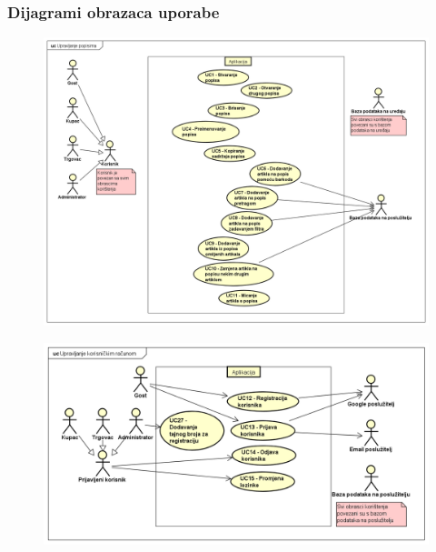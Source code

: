 			\subsubsection{Dijagrami obrazaca uporabe}
			    \begin{figure}[H]
			        \begin{center}
		            \includegraphics[width=.9\linewidth]{dijagrami/uc_upravljanje_popisima.png}
		            \label{fig:uc_upravljanje_popisima}
	                \end{center}
	            \end{figure}		
			    \begin{figure}[H]
			        \begin{center}
		            \includegraphics[width=.9\linewidth]{dijagrami/uc_kor_racun.png}
		            \label{fig:uc_kor_racun}
	                \end{center}
	            \end{figure}		
